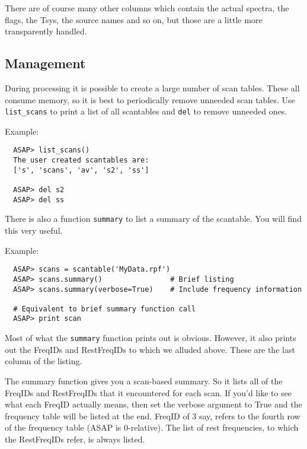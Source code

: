 \documentclass[11pt]{article}
\newcommand{\cmd}[1]{{\tt #1}}
\begin{document}
There are of course many other columns which contain the actual spectra,
the flags, the Tsys, the source names and so on, but those are a little
more transparently handled.

\subsection{Management}

During processing it is possible to create
a large number of scan tables. These all consume memory, so it is best
to periodically remove unneeded scan tables. Use \cmd{list\_scans} to
print a list of all scantables and \cmd{del} to remove unneeded ones.

Example:

\begin{verbatim}
  ASAP> list_scans()
  The user created scantables are:
  ['s', 'scans', 'av', 's2', 'ss']

  ASAP> del s2
  ASAP> del ss
\end{verbatim}

There is also a function \cmd{summary} to list a summary of the scantable.
You will find this very useful.

Example:

\begin{verbatim}
  ASAP> scans = scantable('MyData.rpf')
  ASAP> scans.summary()                # Brief listing
  ASAP> scans.summary(verbose=True)    # Include frequency information

  # Equivalent to brief summary function call
  ASAP> print scan
\end{verbatim}

Most of what the \cmd{summary} function  prints out is obvious. However,
it also prints out the FreqIDs and RestFreqIDs to which we alluded above.
These are the last column of the listing.

The summary function gives you a scan-based summary.  So it lists all of
the FreqIDs and RestFreqIDs that it encountered for each scan.  If you'd
like to see what each FreqID actually means, then set the verbose
argument to True and the frequency table will be listed at the end.
FreqID of 3 say, refers to the fourth row of the frequency table (ASAP
is 0-relative). The list of rest frequencies, to which the RestFreqIDs
refer, is always listed.


\end{document}
